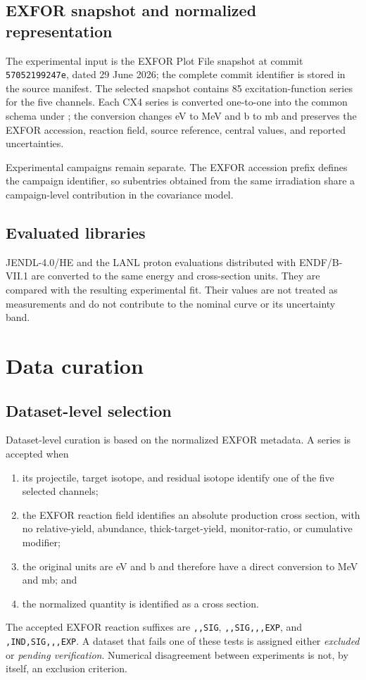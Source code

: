 \documentclass[11pt]{article}
\begin{document}
\subsection{EXFOR snapshot and normalized representation}

The experimental input is the EXFOR Plot File snapshot at commit
\texttt{57052199247e}, dated 29 June 2026; the complete commit identifier is
stored in the source manifest.  The selected snapshot contains 85
excitation-function series for the five channels.  Each CX4 series is converted
one-to-one into the common schema under ; the
conversion changes eV to MeV and b to mb and preserves the EXFOR accession,
reaction field, source reference, central values, and reported uncertainties.

Experimental campaigns remain separate.  The EXFOR accession prefix defines
the campaign identifier, so subentries obtained from the same irradiation
share a campaign-level contribution in the covariance model.

\subsection{Evaluated libraries}

JENDL-4.0/HE and the LANL proton evaluations distributed with ENDF/B-VII.1 are
converted to the same energy and cross-section units.  They are compared with
the resulting experimental fit.  Their values are not treated as
measurements and do not contribute to the nominal curve or its uncertainty
band.

\section{Data curation}

\subsection{Dataset-level selection}

Dataset-level curation is based on the normalized EXFOR metadata.  A series is
accepted when
\begin{enumerate}
  \item its projectile, target isotope, and residual isotope identify one of
        the five selected channels;
  \item the EXFOR reaction field identifies an absolute production cross
        section, with no relative-yield, abundance, thick-target-yield,
        monitor-ratio, or cumulative modifier;
  \item the original units are eV and b and therefore have a direct conversion
        to MeV and mb; and
  \item the normalized quantity is identified as a cross section.
\end{enumerate}
The accepted EXFOR reaction suffixes are \texttt{,,SIG},
\texttt{,,SIG,,,EXP}, and \texttt{,IND,SIG,,,EXP}.  A dataset that fails one
of these tests is assigned either \emph{excluded} or \emph{pending
verification}.  Numerical disagreement between experiments is not, by itself,
an exclusion criterion.
\end{document}

